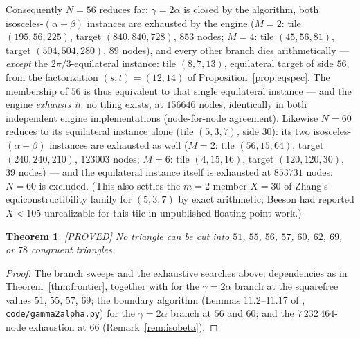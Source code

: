 \documentclass[11pt,reqno]{amsart}
\theoremstyle{plain}
\newtheorem{theorem}{Theorem}
\theoremstyle{definition}
\newcommand{\lab}[1]{\hfill\textnormal{\footnotesize\textsc{[#1]}}}
\begin{document}
Consequently $N=56$ reduces far: $\gamma=2\alpha$ is closed by the algorithm, both
isosceles-$(\alpha{+}\beta)$ instances are exhausted by the engine ($M{=}2$: tile $(195,56,225)$,
target $(840,840,728)$, $853$ nodes; $M{=}4$: tile $(45,56,81)$, target $(504,504,280)$, $89$
nodes), and every other branch dies arithmetically --- \emph{except} the $2\pi/3$-equilateral
instance: tile $(8,7,13)$, equilateral target of side $56$, from the factorization
$(s,t)=(12,14)$ of Proposition~\ref{prop:eqspec}. The membership of $56$ is thus equivalent to
that single equilateral instance --- and the engine \emph{exhausts it}: no tiling exists, at
$156646$ nodes, identically in both independent engine implementations (node-for-node
agreement). Likewise $N=60$ reduces to its equilateral instance alone (tile $(5,3,7)$, side
$30$): its two isosceles-$(\alpha{+}\beta)$ instances are exhausted as well ($M{=}2$: tile
$(56,15,64)$, target $(240,240,210)$, $123003$ nodes; $M{=}6$: tile $(4,15,16)$, target
$(120,120,30)$, $39$ nodes) --- and the equilateral instance itself is exhausted at $853731$
nodes: $N=60$ is excluded. (This also settles the $m{=}2$ member $X=30$ of Zhang's
equiconstructibility family for $(5,3,7)$ by exact arithmetic; Beeson had reported $X<105$
unrealizable for this tile in unpublished floating-point work.)

\begin{theorem}\label{thm:frontier3}\lab{PROVED}
No triangle can be cut into $51$, $55$, $56$, $57$, $60$, $62$, $69$, or $78$
congruent triangles.
\end{theorem}

\begin{proof}
The branch sweeps and the exhaustive searches above; dependencies as in
Theorem~\ref{thm:frontier}, together with \cite[Thm.~11.7]{BeesonIso} for the $\gamma=2\alpha$
branch at the squarefree values $51$, $55$, $57$, $69$; the boundary algorithm (Lemmas 11.2--11.17 of
\cite{BeesonIso}, \texttt{code/gamma2alpha.py}) for the $\gamma=2\alpha$ branch at $56$ and
$60$; and the $7\,232\,464$-node exhaustion at $66$ (Remark~\ref{rem:isobeta}).
\end{proof}
\end{document}
